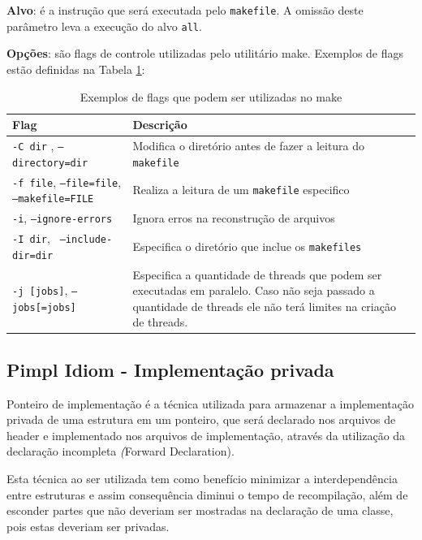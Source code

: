 \textbf{Alvo}: é a instrução que será executada pelo \texttt{makefile}. 
A omissão deste parâmetro leva a execução do alvo \texttt{all}.
    
\textbf{Opções}: são flags de controle utilizadas pelo utilitário make.
 Exemplos de flags estão definidas na Tabela \ref{tab:tabela_05}:

\begin{table}[h]
    \centering
    \caption {Exemplos de flags que podem ser utilizadas no make}
    \label{tab:tabela_05}
    \begin{tabular}{ lp{8cm}}
    \toprule
    \textbf{Flag} & \textbf{Descrição}\\
    \midrule
    \texttt{-C dir} , \texttt{--directory=dir} & Modifica o diretório antes de fazer a leitura do \texttt{makefile}\\
    \midrule
    \texttt{-f file}, \texttt{--file=file}, \texttt{--makefile=FILE} & Realiza a leitura de um \texttt{makefile} especifico\\
    \midrule
    \texttt{-i}, \texttt{--ignore-errors} & Ignora erros na reconstrução de arquivos\\
    \midrule
    \texttt{-I dir}, \texttt{ --include-dir=dir} & Especifica o diretório que inclue os \texttt{makefiles}\\
    \midrule
    \texttt{-j [jobs]}, \texttt{--jobs[=jobs]} & Especifica a quantidade de threads
                                 que podem ser executadas em paralelo. 
                                 Caso não seja passado a quantidade de
                                 threads ele não terá limites na criação
                                 de threads.\\
    \bottomrule
    \end{tabular}
\end{table}


\subsection{Pimpl Idiom - Implementação privada} \label{Pimpl_Idiom}

Ponteiro de implementação é a técnica utilizada para armazenar a
 implementação privada de uma estrutura em um ponteiro, que será
 declarado nos arquivos de header e implementado nos arquivos de
 implementação, através da utilização da declaração incompleta 
\textit(Forward Declaration).

Esta técnica ao ser utilizada tem como benefício minimizar a
 interdependência entre estruturas e assim consequência diminui o
 tempo de recompilação, além de esconder partes que não deveriam
 ser mostradas na declaração de uma classe, pois estas
 deveriam ser privadas.\cite{style_idioms}

